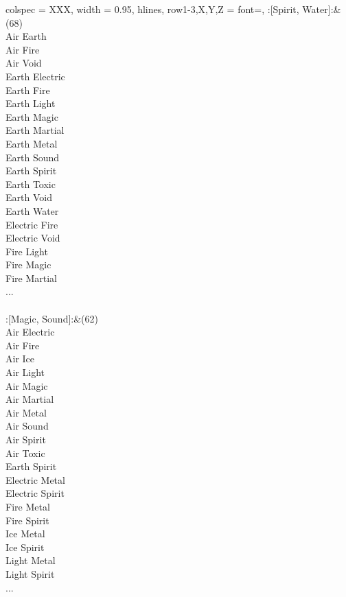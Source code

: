 \begin{longtblr}[
	caption = {2v2 Defending Weak},
	label = {2v2-Defending-Weak},
]{
	colspec = {XXX}, width = 0.95\linewidth,
	hlines,
	row{1-3,X,Y,Z} = {font=\bfseries},
}
	:[Spirit, Water]:&{(68)\\
	Air Earth \\
	Air Fire \\
	Air Void \\
	Earth Electric \\
	Earth Fire \\
	Earth Light \\
	Earth Magic \\
	Earth Martial \\
	Earth Metal \\
	Earth Sound \\
	Earth Spirit \\
	Earth Toxic \\
	Earth Void \\
	Earth Water \\
	Electric Fire \\
	Electric Void \\
	Fire Light \\
	Fire Magic \\
	Fire Martial \\
	...\\
	}\\

	:[Magic, Sound]:&{(62)\\
	Air Electric \\
	Air Fire \\
	Air Ice \\
	Air Light \\
	Air Magic \\
	Air Martial \\
	Air Metal \\
	Air Sound \\
	Air Spirit \\
	Air Toxic \\
	Earth Spirit \\
	Electric Metal \\
	Electric Spirit \\
	Fire Metal \\
	Fire Spirit \\
	Ice Metal \\
	Ice Spirit \\
	Light Metal \\
	Light Spirit \\
	...\\
	}\\


\end{longtblr}
